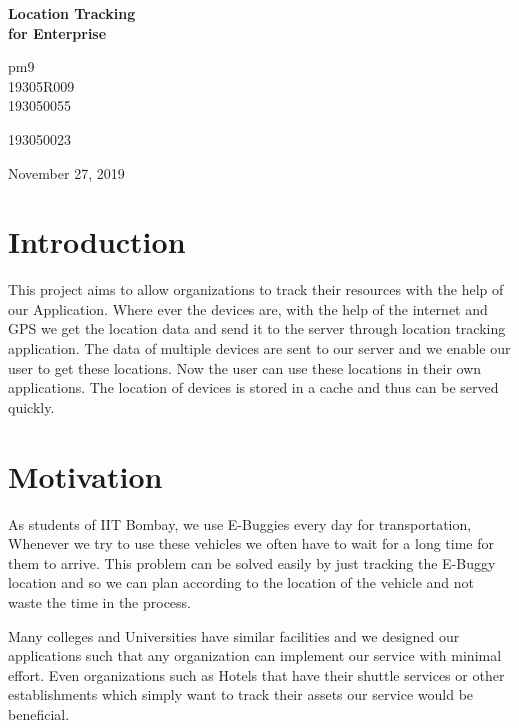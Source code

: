 \documentclass{article}
\begin{document}
 

\begin{titlepage} 
    \centering     
    \vspace*{3.5cm}         
    
    \vspace*{2.4cm}     
 
    \Huge \textbf{Location Tracking\\for Enterprise}     
 
    \vspace*{0.8cm}     
 
    \large{pm9}\\
    \large{19305R009} \\
    \large{193050055}
     
    \large{193050023}
    \vspace*{0.5cm}     
 
    \large{November 27, 2019}     
    \vspace*{4.0cm}     
 
    \vspace*{\fill} 
\end{titlepage}

\tableofcontents 
\newpage

\section{Introduction}
This project aims to allow organizations to track their resources with the help of our Application. Where ever the devices are, with the help of the internet and GPS we get the location data and send it to the server through location tracking application. The data of multiple devices are sent to our server and we enable our user to get these locations. Now the user can use these locations in their own applications. The location of devices is stored in a cache and thus can be served quickly.
\section{Motivation}
As students of IIT Bombay, we use E-Buggies every day for transportation, Whenever we try to use these vehicles we often have to wait for a long time for them to arrive. This problem can be solved easily by just tracking the E-Buggy location and so we can plan according to the location of the vehicle and not waste the time in the process.
\par
Many colleges and Universities have similar facilities and we designed our applications such that any organization can implement our service with minimal effort. Even organizations such as Hotels that have their shuttle services or other establishments which simply want to track their assets our service would be beneficial.
\end{document}
